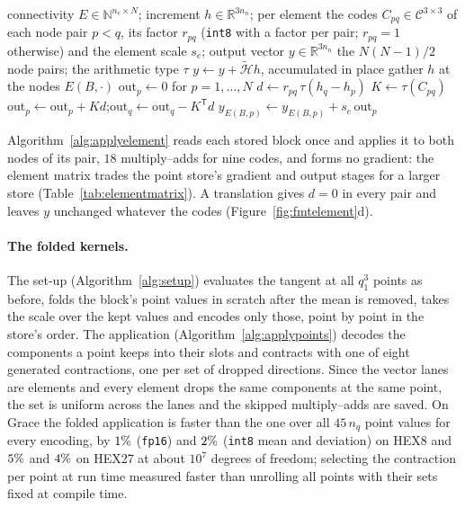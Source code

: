 \documentclass[sigconf,balance=false]{acmart}
\newcommand{\R}{\mathbb{R}}
\begin{document}
\begin{algorithm*}[t]
\caption{Application, element matrix in difference form}
\label{alg:applyelement}
\begin{algorithmic}[1]
\Require connectivity $E\in\mathbb{N}^{n_e\times N}$; increment $h\in\R^{3n_n}$; per element the codes
  $C_{pq}\in\mathcal{C}^{3\times3}$ of each node pair $p<q$, its factor $r_{pq}$ (\texttt{int8} with a
  factor per pair; $r_{pq}=1$ otherwise) and the element scale $s_e$; output vector $y\in\R^{3n_n}$
\Constants the $N(N-1)/2$ node pairs; the arithmetic type $\tau$
\Ensure $y \gets y + \widetilde{\mathcal{H}}h$, accumulated in place 
  \State gather $h$ at the nodes $E(B,\cdot)$ 
  \State $\mathrm{out}_p \gets 0$ for $p=1,\dots,N$
    \State $d \gets r_{pq}\,\tau(h_q - h_p)$ 
    \State $K \gets \tau(C_{pq})$ 
    \State $\mathrm{out}_p \gets \mathrm{out}_p + K d$;\quad $\mathrm{out}_q \gets \mathrm{out}_q - K^{\mathsf T} d$
  \EndFor
  \State $y_{E(B,p)} \gets y_{E(B,p)} + s_e\,\mathrm{out}_p$ 
\EndFor
\end{algorithmic}
\end{algorithm*}

Algorithm~\ref{alg:applyelement} reads each stored block once and applies it to both nodes of its pair,
$18$ multiply--adds for nine codes, and forms no gradient: the element matrix trades the point store's
gradient and output stages for a larger store (Table~\ref{tab:elementmatrix}).  A translation gives
$d=0$ in every pair and leaves $y$ unchanged whatever the codes (Figure~\ref{fig:fmtelement}d).

\paragraph{The folded kernels.}  The set-up (Algorithm~\ref{alg:setup}) evaluates the tangent at all
$q_1^3$ points as before, folds the block's point values in scratch after the mean is removed, takes
the scale over the kept values and encodes only those, point by point in the store's order.  The
application (Algorithm~\ref{alg:applypoints}) decodes the components a point keeps into their slots
and contracts with one of eight generated contractions, one per set of dropped directions.  Since
the vector lanes are elements and every element drops the same components at the same point, the
set is uniform across the lanes and the skipped multiply--adds are saved.  On Grace the folded
application is faster than the one over all $45\,n_q$ point values for every encoding, by
$1\%$ (\texttt{fp16}) and $2\%$ (\texttt{int8} mean and
deviation) on HEX8 and $5\%$ and $4\%$ on HEX27
at about $10^7$ degrees of freedom; selecting the contraction per point at run time measured faster
than unrolling all points with their sets fixed at compile time.
\end{document}
